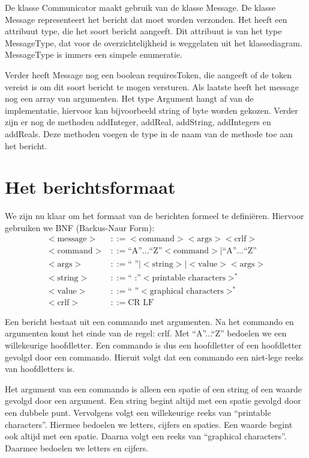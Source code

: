 \documentclass[a4paper,11pt]{article}
\begin{document}
De klasse Communicator maakt gebruik van de klasse Message. De klasse Message representeert het bericht dat moet worden verzonden. Het heeft een attribuut type, die het soort bericht aangeeft. Dit attribuut is van het type MessageType, dat voor de overzichtelijkheid is weggelaten uit het klassediagram. MessageType is immers een simpele enumeratie.

Verder heeft Message nog een boolean requiresToken, die aangeeft of de token vereist is om dit soort bericht te mogen versturen.  Als laatste heeft het message nog een array van argumenten. Het type Argument hangt af van de implementatie, hiervoor kan bijvoorbeeld string of byte worden gekozen. Verder zijn er nog de methoden addInteger, addReal, addString, addIntegers en addReals. Deze methoden voegen de type in de naam van de methode toe aan het bericht.

    \section{Het berichtsformaat}
    \label{sec:protocol}
    We zijn nu klaar om het formaat van de berichten formeel te defini\"eren. Hiervoor gebruiken we BNF (Backus-Naur Form):
    \begin{align*}
    <\text{message}> &::= <\text{command}> <\text{args}> <\text{crlf}> \\
    <\text{command}> &::= \text{``A''...``Z''} <\text{command}> | \text{``A''...``Z''} \\
    <\text{args}>    &::= \text{`` ''} | <\text{string}> | <\text{value}> <\text{args}> \\
    <\text{string}>  &::= \text{`` :''} <\text{printable characters}>^{*} \\
    <\text{value}>   &::= \text{`` ''}  <\text{graphical characters}>^{*} \\
    <\text{crlf}>    &::= \text{CR LF}
    \end{align*}

    Een bericht bestaat uit een commando met argumenten. Na het commando en argumenten komt het einde van de regel: crlf. Met ``A''...``Z'' bedoelen we een willekeurige hoofdletter. Een commando is dus een hoofdletter of een hoofdletter gevolgd door een commando. Hieruit volgt dat een commando een niet-lege reeks van hoofdletters is.

    Het argument van een commando is alleen een spatie of een string of een waarde gevolgd door een argument. Een string begint altijd met een spatie gevolgd door een dubbele punt. Vervolgens volgt een willekeurige reeks van ``printable characters''. Hiermee bedoelen we letters, cijfers en spaties. Een waarde begint ook altijd met een spatie. Daarna volgt een reeks van ``graphical characters''. Daarmee bedoelen we letters en cijfers.
\end{document}
